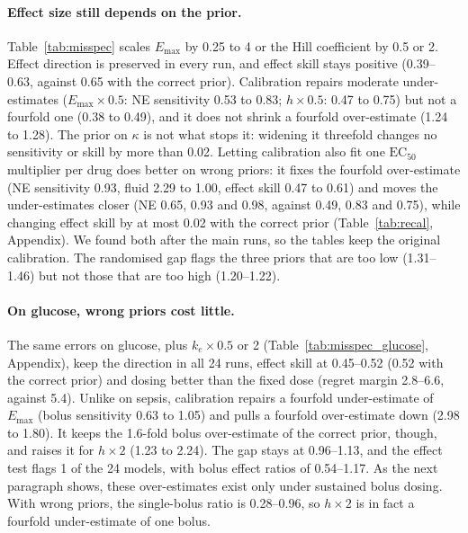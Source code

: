 \documentclass[letterpaper]{article}
\newcommand{\Emax}{E_{\max}}
\begin{document}
\paragraph{Effect size still depends on the prior.} Table~\ref{tab:misspec} scales $\Emax$ by 0.25 to 4 or the Hill coefficient by 0.5 or 2. Effect direction is preserved in every run, and effect skill stays positive (0.39--0.63, against 0.65 with the correct prior). Calibration repairs moderate under-estimates ($\Emax\times0.5$: NE sensitivity 0.53 to 0.83; $h\times0.5$: 0.47 to 0.75) but not a fourfold one (0.38 to 0.49), and it does not shrink a fourfold over-estimate (1.24 to 1.28). The prior on $\kappa$ is not what stops it: widening it threefold changes no sensitivity or skill by more than 0.02. Letting calibration also fit one $\mathrm{EC}_{50}$ multiplier per drug does better on wrong priors: it fixes the fourfold over-estimate (NE sensitivity 0.93, fluid 2.29 to 1.00, effect skill 0.47 to 0.61) and moves the under-estimates closer (NE 0.65, 0.93 and 0.98, against 0.49, 0.83 and 0.75), while changing effect skill by at most 0.02 with the correct prior (Table~\ref{tab:recal}, Appendix). We found both after the main runs, so the tables keep the original calibration. The randomised gap flags the three priors that are too low (1.31--1.46) but not those that are too high (1.20--1.22).

\paragraph{On glucose, wrong priors cost little.} The same errors on glucose, plus $k_e\times0.5$ or 2 (Table~\ref{tab:misspec_glucose}, Appendix), keep the direction in all 24 runs, effect skill at 0.45--0.52 (0.52 with the correct prior) and dosing better than the fixed dose (regret margin 2.8--6.6, against 5.4). Unlike on sepsis, calibration repairs a fourfold under-estimate of $\Emax$ (bolus sensitivity 0.63 to 1.05) and pulls a fourfold over-estimate down (2.98 to 1.80). It keeps the 1.6-fold bolus over-estimate of the correct prior, though, and raises it for $h\times2$ (1.23 to 2.24). The gap stays at 0.96--1.13, and the effect test flags 1 of the 24 models, with bolus effect ratios of 0.54--1.17. As the next paragraph shows, these over-estimates exist only under sustained bolus dosing. With wrong priors, the single-bolus ratio is 0.28--0.96, so $h\times2$ is in fact a fourfold under-estimate of one bolus.
\end{document}
